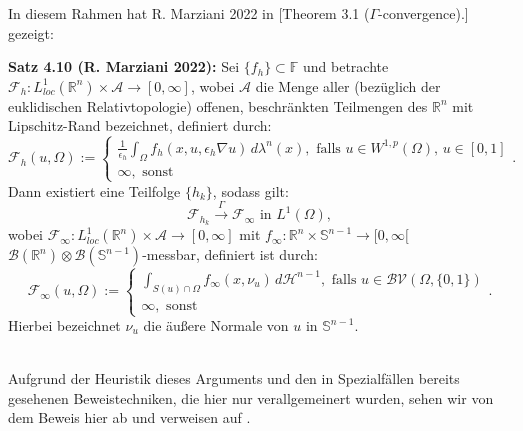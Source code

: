 In diesem Rahmen hat R. Marziani 2022 in \cite{Mar22}[Theorem 3.1 (\(\Gamma\)-convergence).] gezeigt:\\[0.5cm]
\colorbox{generalYellow}{\begin{minipage}{16cm}{\textcolor{black}{}{\label{theo4.10}}}
\textbf{Satz 4.10 (R. Marziani 2022):} Sei \(\{f_h\} \subset \mathbb{F}\) und betrachte \(\mathcal{F}_h : L^1_{loc}(\mathbb{R}^n) \times \mathcal{A} \to [0,\infty]\), wobei \(\mathcal{A}\) die Menge aller (bezüglich der euklidischen Relativtopologie) offenen, beschränkten Teilmengen des \(\mathbb{R}^n\) mit Lipschitz-Rand bezeichnet, definiert durch:
\begin{equation}
    \mathcal{F}_h (u,\Omega) := \begin{cases}
        \frac{1}{\epsilon_h} \int_{\Omega} f_h (x,u,\epsilon_h \nabla u) \,d\lambda^n(x), \text{ falls }u \in W^{1,p}(\Omega), \, u \in [0,1]\\
        \infty, \text{ sonst}
    \end{cases}.
\end{equation}
Dann existiert eine Teilfolge \(\{h_k\}\), sodass gilt:
\begin{equation}
    \mathcal{F}_{h_k} \stackrel{\Gamma}{\to} \mathcal{F}_{\infty} \text{ in }L^1(\Omega),
\end{equation}
wobei \(\mathcal{F}_{\infty} : L^1_{loc}(\mathbb{R}^n) \times \mathcal{A} \to [0,\infty]\) mit \(f_{\infty} : \mathbb{R}^n \times \mathbb{S}^{n-1} \to [0,\infty[\) \(\mathcal{B}(\mathbb{R}^n) \otimes \mathcal{B}(\mathbb{S}^{n-1})\)-messbar, definiert ist durch:
\begin{equation}
    \mathcal{F}_{\infty}(u,\Omega) := \begin{cases}
        \int_{S(u) \cap \Omega} f_{\infty}(x,\nu_u) \,d\mathcal{H}^{n-1}, \text{ falls }u \in \mathcal{BV}(\Omega,\{0,1\}) \\
        \infty, \text{ sonst}
    \end{cases}.
\end{equation}
Hierbei bezeichnet \(\nu_u\) die äußere Normale von \(u\) in \(\mathbb{S}^{n-1}\).
\end{minipage}}\\

Aufgrund der Heuristik dieses Arguments und den in Spezialfällen bereits gesehenen Beweistechniken, die hier nur verallgemeinert wurden, sehen wir von dem Beweis hier ab und verweisen auf \cite{Mar22}.
